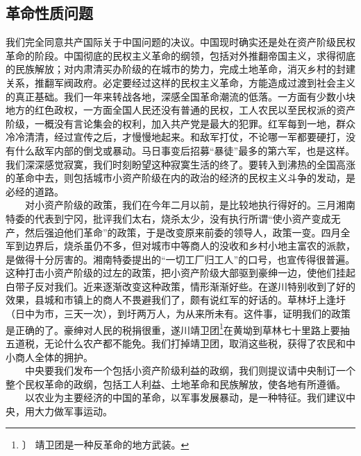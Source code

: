 \documentclass[cn,11pt,chinese]{elegantbook}
\def\myformat#1{\hfil\hfil #1}
\begin{document}
\subsection*{\myformat{革命性质问题}}
我们完全同意共产国际关于中国问题的决议。中国现时确实还是处在资产阶级民权革命的阶段。中国彻底的民权主义革命的纲领，包括对外推翻帝国主义，求得彻底的民族解放；对内肃清买办阶级的在城市的势力，完成土地革命，消灭乡村的封建关系，推翻军阀政府。必定要经过这样的民权主义革命，方能造成过渡到社会主义的真正基础。我们一年来转战各地，深感全国革命潮流的低落。一方面有少数小块地方的红色政权，一方面全国人民还没有普通的民权，工人农民以至民权派的资产阶级，一概没有言论集会的权利，加入共产党是最大的犯罪。红军每到一地，群众冷冷清清，经过宣传之后，才慢慢地起来。和敌军打仗，不论哪一军都要硬打，没有什么敌军内部的倒戈或暴动。马日事变后招募“暴徒”最多的第六军，也是这样。我们深深感觉寂寞，我们时刻盼望这种寂寞生活的终了。要转入到沸热的全国高涨的革命中去，则包括城市小资产阶级在内的政治的经济的民权主义斗争的发动，是必经的道路。\\
　　对小资产阶级的政策，我们在今年二月以前，是比较地执行得好的。三月湘南特委的代表到宁冈，批评我们太右，烧杀太少，没有执行所谓“使小资产变成无产，然后强迫他们革命”的政策，于是改变原来前委的领导人，政策一变。四月全军到边界后，烧杀虽仍不多，但对城市中等商人的没收和乡村小地主富农的派款，是做得十分厉害的。湘南特委提出的“一切工厂归工人”的口号，也宣传得很普遍。这种打击小资产阶级的过左的政策，把小资产阶级大部驱到豪绅一边，使他们挂起白带子反对我们。近来逐渐改变这种政策，情形渐渐好些。在遂川特别收到了好的效果，县城和市镇上的商人不畏避我们了，颇有说红军的好话的。草林圩上逢圩（日中为市，三天一次），到圩两万人，为从来所未有。这件事，证明我们的政策是正确的了。豪绅对人民的税捐很重，遂川靖卫团\footnote[26]{〕 靖卫团是一种反革命的地方武装。}在黄坳到草林七十里路上要抽五道税，无论什么农产都不能免。我们打掉靖卫团，取消这些税，获得了农民和中小商人全体的拥护。\\
　　中央要我们发布一个包括小资产阶级利益的政纲，我们则提议请中央制订一个整个民权革命的政纲，包括工人利益、土地革命和民族解放，使各地有所遵循。\\
　　以农业为主要经济的中国的革命，以军事发展暴动，是一种特征。我们建议中央，用大力做军事运动。\\
\end{document}

